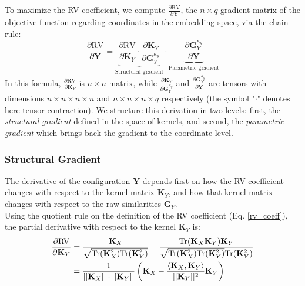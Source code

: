 \documentclass[11pt]{article}
\begin{document}
	To maximize the RV coefficient, we compute $\frac{\partial \text{RV}}{\partial \mathbf{Y}}$, the $n \times q$ gradient matrix of the objective function regarding coordinates in the embedding space, via the chain rule: 
	\begin{equation}
		\frac{\partial \text{RV}}{\partial \mathbf{Y}} = \underbrace{\frac{\partial \text{RV}}{\partial \mathbf{K}_Y} \cdot \frac{\partial \mathbf{K}_Y}{\partial \mathbf{G}^{\kappa_y}_Y}}_{\text{Structural gradient}} \cdot \underbrace{\frac{\partial \mathbf{G}^{\kappa_y}_Y}{\partial \mathbf{Y}}}_{\text{Parametric gradient}}
	\end{equation}
	In this formula, $\frac{\partial \text{RV}}{\partial \mathbf{K}_Y}$ is $n \times n$ matrix, while $\frac{\partial \mathbf{K}_Y}{\partial \mathbf{G}^{\kappa_y}_Y}$ and $\frac{\partial \mathbf{G}^{\kappa_y}_Y}{\partial \mathbf{Y}}$ are tensors with dimensions $n \times n \times n \times n$ and $n \times n \times n \times q$ respectively (the symbol "$\cdot$" denotes here tensor contraction). We structure this derivation in two levels: first, the \emph{structural gradient} defined in the space of kernels, and second, the \emph{parametric gradient} which brings back the gradient to the coordinate level.
	
	\subsubsection{Structural Gradient}
	
	The derivative of the configuration $\mathbf{Y}$ depends first on how the RV coefficient changes with respect to the kernel matrix $\mathbf{K}_Y$, and how that kernel matrix changes with respect to the raw similarities $\mathbf{G}_Y$. \\
	
	Using the quotient rule on the definition of the RV coefficient (Eq. \ref{rv_coeff}), the partial derivative with respect to the kernel $\mathbf{K}_Y$ is:
	\begin{align}
		\frac{\partial \text{RV}}{\partial \mathbf{K}_Y} &= \frac{\mathbf{K}_X}{\sqrt{\text{Tr}(\mathbf{K}^2_X)\text{Tr}(\mathbf{K}^2_Y)}} - \frac{\text{Tr}(\mathbf{K}_X \mathbf{K}_Y) \mathbf{K}_Y}{\sqrt{\text{Tr}(\mathbf{K}^2_X)\text{Tr}(\mathbf{K}^2_Y)} \text{Tr}(\mathbf{K}^2_Y)} \notag \\
		&= \frac{1}{||\mathbf{K}_X|| \cdot ||\mathbf{K}_Y||} \left( \mathbf{K}_X - \frac{\langle \mathbf{K}_X, \mathbf{K}_Y \rangle}{||\mathbf{K}_Y||^2} \mathbf{K}_Y \right) \label{eq:structural_residual}
	\end{align}
	
\end{document}
